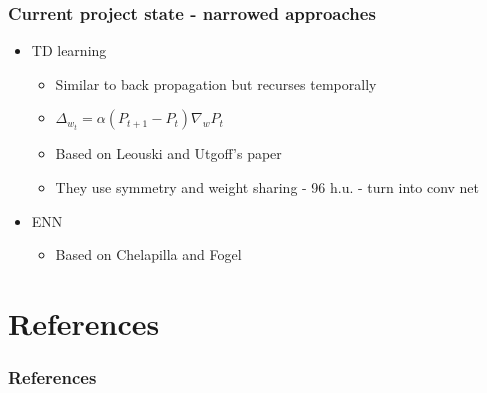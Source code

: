\documentclass{beamer}
\begin{document}
\begin{frame}
\frametitle{Current project state - narrowed approaches}
\begin{itemize}
\item<1->TD learning
\begin{itemize}
\item<2,3>Similar to back propagation but recurses temporally
\item<3>$\Delta_{w_t} = \alpha(P_{t+1} - P_t)\nabla_w P_t$
\item<4->Based on Leouski and Utgoff's paper\cite{Leouski96whata}
\item<5>They use symmetry and weight sharing - 96 h.u. - turn into conv net
\end{itemize}
\item<6->ENN
\begin{itemize}
\item<7>Based on Chelapilla and Fogel\cite{chellapilla1999evolution}
\end{itemize}
\end{itemize}

\end{frame}


\section{References}

\begin{frame}%
        \frametitle{References}
        
\end{frame}
\end{document}
